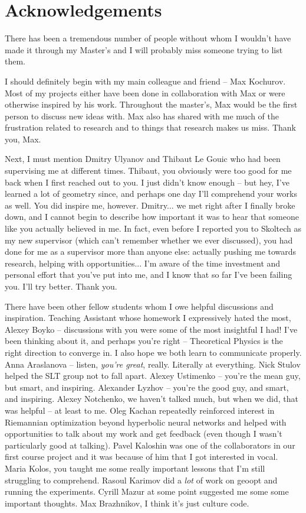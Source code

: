 \section*{Acknowledgements}

There has been a tremendous number of people without whom I wouldn't have made
it through my Master's and I will probably miss someone trying to list them.

I should definitely begin with my main colleague and friend -- Max Kochurov.
Most of my projects either have been done in collaboration with Max or were
otherwise inspired by his work. Throughout the master's, Max would be the first
person to discuss new ideas with. Max also has shared with me much of the
frustration related to research and to things that research makes us miss.
Thank you, Max.

Next, I must mention Dmitry Ulyanov and Thibaut Le Gouic who had been
supervising me at different times. Thibaut, you obviously were too good for me
back when I first reached out to you. I just didn't know enough -- but hey,
I've learned a lot of geometry since, and perhaps one day I'll comprehend your
works as well.  You did inspire me, however. Dmitry... we met right after I
finally broke down, and I cannot begin to describe how important it was to hear
that someone like you actually believed in me. In fact, even before I reported
you to Skoltech as my new supervisor (which can't remember whether we ever
discussed), you had done for me as a supervisor more than anyone else: actually
pushing me towards research, helping with opportunities... I'm aware of the
time investment and personal effort that you've put into me, and I know that so
far I've been failing you. I'll try better. Thank you.

There have been other fellow students whom I owe helpful discussions and
inspiration. Teaching Assistant whose homework I expressively hated the most,
Alexey Boyko -- discussions with you were some of the most insightful I had!
I've been thinking about it, and perhaps you're right -- Theoretical Physics is
the right direction to converge in. I also hope we both learn to communicate
properly.
Anna Araslanova -- listen, \emph{you're great}, really. Literally at
everything.
Nick Stulov helped the SLT group not to fall apart.
Alexey Ustimenko -- you're the mean guy, but smart, and inspiring.
Alexander Lyzhov -- you're the good guy, and smart, and inspiring.
Alexey Notchenko, we haven't talked much, but when we did, that was
helpful -- at least to me. Oleg Kachan repeatedly reinforced interest in
Riemannian optimization beyond hyperbolic neural networks and helped with
opportunities to talk about my work and get feedback (even though I wasn't
particularly good at talking).
Pavel Kaloshin was one of the collaborators in our first course project and it
was because of him that I got interested in vocal.
Maria Kolos, you taught me some really important lessons that I'm still
struggling to comprehend.
Rasoul Karimov did a \emph{lot} of work on geoopt and running the experiments.
Cyrill Mazur at some point suggested me some some important thoughts.
Max Brazhnikov, I think it's just culture code.

